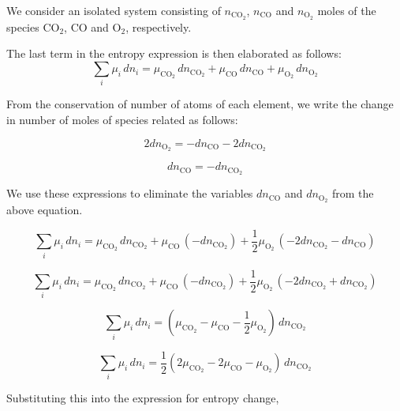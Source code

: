 We consider an isolated system consisting of $n_{\text{CO}_2}$, $n_\text{CO}$ and $n_{\text{O}_2}$ moles of the species $\text{CO}_2$, $\text{CO}$ and $\text{O}_2$, respectively.

The last term in the entropy expression is then elaborated as follows:
\begin{equation} \sum_{i}{ \mu_i \, dn_i} = \mu_{\text{CO}_2} \, dn_{\text{CO}_2}  +  \mu_\text{CO} \, dn_\text{CO}  + \mu_{\text{O}_2} \, dn_{\text{O}_2} \end{equation}

From the conservation of number of atoms of each element, we write the change in number of moles of species related as follows:

\begin{equation} 2 dn_{\text{O}_2} = -dn_\text{CO} - 2 dn_{\text{CO}_2} \end{equation}

\begin{equation} dn_\text{CO} = -dn_{\text{CO}_2} \end{equation}

We use these expressions to eliminate the variables $dn_\text{CO}$ and $dn_{\text{O}_2}$ from the above equation.

\begin{equation} \sum_{i}{ \mu_i \, dn_i} = \mu_{\text{CO}_2} \, dn_{\text{CO}_2}  +  \mu_\text{CO} \, \left( - dn_{\text{CO}_2} \right) + \frac{1}{2} \mu_{\text{O}_2} \, \left( -2dn_{\text{CO}_2} -dn_\text{CO} \right) \end{equation}

\begin{equation} \sum_{i}{ \mu_i \, dn_i} = \mu_{\text{CO}_2} \, dn_{\text{CO}_2}  +  \mu_\text{CO} \, \left( - dn_{\text{CO}_2} \right) + \frac{1}{2} \mu_{\text{O}_2} \, \left( -2dn_{\text{CO}_2} + dn_{\text{CO}_2} \right) \end{equation}

\begin{equation} \sum_{i}{ \mu_i \, dn_i} = \left( \mu_{\text{CO}_2} -  \mu_\text{CO} - \frac{1}{2} \mu_{\text{O}_2}  \right) \, dn_{\text{CO}_2} \end{equation}

\begin{equation} \sum_{i}{ \mu_i \, dn_i} = \frac{1}{2} \left( 2 \mu_{\text{CO}_2} -  2\mu_\text{CO} - \mu_{\text{O}_2}  \right) \, dn_{\text{CO}_2} \end{equation}

Substituting this into the expression for entropy change,


